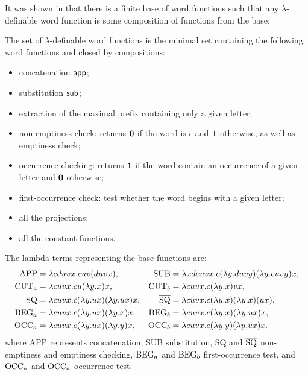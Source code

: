 It was shown in \cite{DBLP:journals/tcs/Zaionc87} that there is a
finite base of word functions such that any $\lambda$-definable word
function is some composition of functions from the base:
\begin{theorem}
The set of $\lambda$-definable word functions is the minimal set containing the following word functions and closed by compositions:
\begin{itemize}
  \item concatenation ${\sf app}$;
  \item substitution ${\sf sub}$;
  \item extraction of the maximal prefix containing only a given letter;
  \item non-emptiness check:  returns $\mathbf{0}$ if the word is $\epsilon$ and $\mathbf{1}$ otherwise, as well as emptiness check;
  \item occurrence checking: returns $\mathbf{1}$ if the word contain an occurrence of a given letter and $\mathbf{0}$ otherwise;
  \item first-occurrence check:  test whether the word begins with a given letter;
  \item all the projections;
  \item all the constant functions.
\end{itemize}
\end{theorem}
The lambda terms representing the base functions are:
\begin{align*}
  {\rm APP} &= \lambda c d u v x.c u v(d u v x), & {\rm SUB} &= \lambda x d e u v x.c(\lambda y.d u v y)(\lambda y . e u v y) x, \\
  {\rm CUT}_a &= \lambda c u v x . c u (\lambda y.x) x, & {\rm CUT}_b &= \lambda c u v x . c (\lambda y.x) v x, \\
  {\rm SQ} &= \lambda c u v x . c (\lambda y.u x) (\lambda y.u x) x, & \overline{{\rm SQ}} &= \lambda c u v x . c (\lambda y.x) (\lambda y.x) (u x), \\
  {\rm BEG}_a &= \lambda c u v x . c (\lambda y.u x) (\lambda y.x) x, & {\rm BEG}_b &= \lambda c u v x . c (\lambda y.x) (\lambda y.u x) x, \\
  {\rm OCC}_a &= \lambda c u v x . c (\lambda y.u x) (\lambda y.y) x, & {\rm OCC}_b &= \lambda c u v x . c (\lambda y.y) (\lambda y.u x) x.
\end{align*}
where {\rm APP} represents concatenation, {\rm SUB} substitution,
{\rm SQ} and $\overline{{\rm SQ}}$ non-emptiness and emptiness checking, ${\rm BEG}_a$ and
${\rm BEG}_b$ first-occurrence test, and ${\rm OCC}_a$ and ${\rm OCC}_a$ occurrence test.

